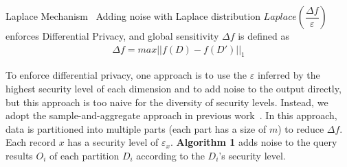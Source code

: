 

\begin{theorem}{Laplace Mechanism~\cite{Dwork2006Differential}}
  Adding noise with Laplace distribution $Laplace(\dfrac{\Delta 
f}{\varepsilon})$ enforces
  Differential Privacy, and global sensitivity $\Delta f$ is defined as
  \vspace{-.1in}
  \begin{align}
    \Delta f = max || f(D) - f(D') ||_1
  \end{align}
\end{theorem}

To enforce differential privacy, one approach is to use the $\varepsilon$ 
inferred by the highest security level of each dimension and to add noise to 
the output directly, but this approach is too naive for the diversity of 
security levels. Instead, we adopt the sample-and-aggregate approach in 
previous work~\cite{differentialdp:stoc11}. In this approach, data is 
partitioned into multiple parts (each part has a size of $m$) to reduce $\Delta 
f$. Each record $x$ has a security level of $\varepsilon_x$.
\textbf{Algorithm 1} adds noise to the query results $O_i$ of 
each partition $D_i$ according to the $D_i$'s security level. 

